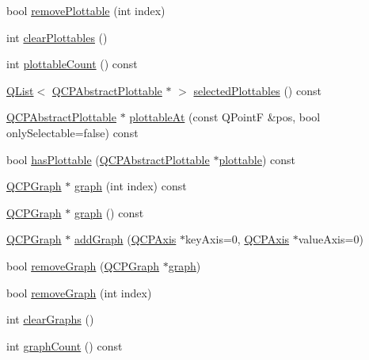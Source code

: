 \begin{DoxyCompactItemize}
\item 
bool \hyperlink{class_q_custom_plot_afc210e0021480f8119bccf37839dbcc8}{remove\+Plottable} (int index)
\item 
int \hyperlink{class_q_custom_plot_a9a409bb3201878adb7ffba1c89c4e004}{clear\+Plottables} ()
\item 
int \hyperlink{class_q_custom_plot_a2dbfbf15dc38713f9a1c445a3dd2e989}{plottable\+Count} () const 
\item 
\hyperlink{class_q_list}{Q\+List}$<$ \hyperlink{class_q_c_p_abstract_plottable}{Q\+C\+P\+Abstract\+Plottable} $\ast$ $>$ \hyperlink{class_q_custom_plot_a6721b8c689bb7f2f400987e580508fe8}{selected\+Plottables} () const 
\item 
\hyperlink{class_q_c_p_abstract_plottable}{Q\+C\+P\+Abstract\+Plottable} $\ast$ \hyperlink{class_q_custom_plot_ac1d1bc6ae4e13616fb02cef6d9e2188e}{plottable\+At} (const Q\+PointF \&pos, bool only\+Selectable=false) const 
\item 
bool \hyperlink{class_q_custom_plot_a4fc28914e2ee91aab424b7ce46b6bdf1}{has\+Plottable} (\hyperlink{class_q_c_p_abstract_plottable}{Q\+C\+P\+Abstract\+Plottable} $\ast$\hyperlink{class_q_custom_plot_a32de81ff53e263e785b83b52ecd99d6f}{plottable}) const 
\item 
\hyperlink{class_q_c_p_graph}{Q\+C\+P\+Graph} $\ast$ \hyperlink{class_q_custom_plot_a6d3ed93c2bf46ab7fa670d66be4cddaf}{graph} (int index) const 
\item 
\hyperlink{class_q_c_p_graph}{Q\+C\+P\+Graph} $\ast$ \hyperlink{class_q_custom_plot_a80c40ced2a74eefe9e92de1e82ba2274}{graph} () const 
\item 
\hyperlink{class_q_c_p_graph}{Q\+C\+P\+Graph} $\ast$ \hyperlink{class_q_custom_plot_a6fb2873d35a8a8089842d81a70a54167}{add\+Graph} (\hyperlink{class_q_c_p_axis}{Q\+C\+P\+Axis} $\ast$key\+Axis=0, \hyperlink{class_q_c_p_axis}{Q\+C\+P\+Axis} $\ast$value\+Axis=0)
\item 
bool \hyperlink{class_q_custom_plot_a903561be895fb6528a770d66ac5e6713}{remove\+Graph} (\hyperlink{class_q_c_p_graph}{Q\+C\+P\+Graph} $\ast$\hyperlink{class_q_custom_plot_a6d3ed93c2bf46ab7fa670d66be4cddaf}{graph})
\item 
bool \hyperlink{class_q_custom_plot_a9554b3d2d5b10c0f884bd4010b6c192c}{remove\+Graph} (int index)
\item 
int \hyperlink{class_q_custom_plot_ab0f3abff2d2f7df3668b5836f39207fa}{clear\+Graphs} ()
\item 
int \hyperlink{class_q_custom_plot_a7d9b4d19114b2fde60f0233eeb0aa682}{graph\+Count} () const 

\end{DoxyCompactItemize}
